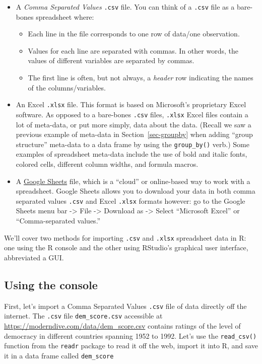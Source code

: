 \documentclass[
  letterpaper,
  DIV=11,
  numbers=noendperiod]{scrreprt}
\providecommand{\tightlist}{%
  \setlength{\itemsep}{0pt}\setlength{\parskip}{0pt}}\usepackage{longtable,booktabs,array}
\theoremstyle{definition}
\theoremstyle{remark}
\begin{document}
\begin{itemize}
\item
  A \emph{Comma Separated Values} \texttt{.csv} file. You can think of a
  \texttt{.csv} file as a bare-bones spreadsheet where:

  \begin{itemize}
  \tightlist
  \item
    Each line in the file corresponds to one row of data/one
    observation.
  \item
    Values for each line are separated with commas. In other words, the
    values of different variables are separated by commas.
  \item
    The first line is often, but not always, a \emph{header} row
    indicating the names of the columns/variables.
  \end{itemize}
\item
  An Excel \texttt{.xlsx} file. This format is based on Microsoft's
  proprietary Excel software. As opposed to a bare-bones \texttt{.csv}
  files, \texttt{.xlsx} Excel files contain a lot of meta-data, or put
  more simply, data about the data. (Recall we saw a previous example of
  meta-data in Section~\ref{sec-groupby} when adding ``group structure''
  meta-data to a data frame by using the \texttt{group\_by()} verb.)
  Some examples of spreadsheet meta-data include the use of bold and
  italic fonts, colored cells, different column widths, and formula
  macros.
\item
  A \href{https://www.google.com/sheets/about/}{Google Sheets} file,
  which is a ``cloud'' or online-based way to work with a spreadsheet.
  Google Sheets allows you to download your data in both comma separated
  values \texttt{.csv} and Excel \texttt{.xlsx} formats however: go to
  the Google Sheets menu bar -\textgreater{} File -\textgreater{}
  Download as -\textgreater{} Select ``Microsoft Excel'' or
  ``Comma-separated values.''
\end{itemize}

We'll cover two methods for importing \texttt{.csv} and \texttt{.xlsx}
spreadsheet data in R: one using the R console and the other using
RStudio's graphical user interface, abbreviated a GUI.

\hypertarget{using-the-console}{%
\subsection{Using the console}\label{using-the-console}}

First, let's import a Comma Separated Values \texttt{.csv} file of data
directly off the internet. The \texttt{.csv} file
\texttt{dem\_score.csv} accessible at
\url{https://moderndive.com/data/dem_score.csv} contains ratings of the
level of democracy in different countries spanning 1952 to 1992. Let's
use the \texttt{read\_csv()} function from the \texttt{readr} package to
read it off the web, import it into R, and save it in a data frame
called \texttt{dem\_score}
\end{document}
